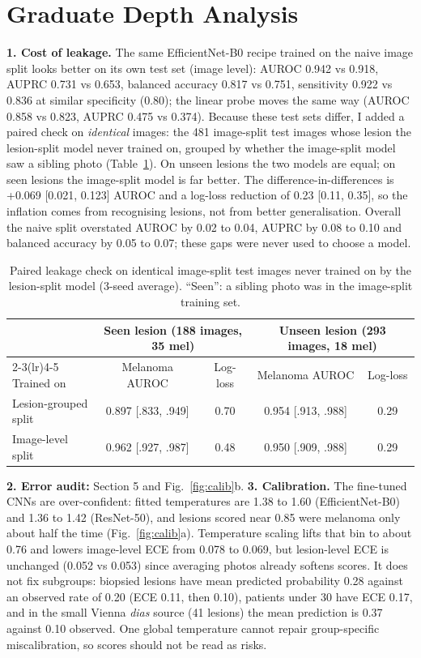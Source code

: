 \documentclass{article}
\newcommand{\ci}[2]{{\scriptsize[#1, #2]}}
\begin{document}
\section{Graduate Depth Analysis}
\textbf{1. Cost of leakage.} The same EfficientNet-B0 recipe trained on the naive image split looks
better on its own test set (image level): AUROC 0.942 vs 0.918, AUPRC 0.731 vs 0.653, balanced
accuracy 0.817 vs 0.751, sensitivity 0.922 vs 0.836 at similar specificity (0.80); the linear probe
moves the same way (AUROC 0.858 vs 0.823, AUPRC 0.475 vs 0.374). Because these test sets differ, I added
a paired check on \emph{identical} images: the 481 image-split test images whose lesion the
lesion-split model never trained on, grouped by whether the image-split model saw a sibling photo
(Table~\ref{tab:leak}). On unseen lesions the two models are equal; on seen lesions the image-split
model is far better. The difference-in-differences is +0.069 \ci{0.021}{0.123} AUROC and a log-loss
reduction of 0.23 \ci{0.11}{0.35}, so the inflation comes from recognising lesions, not from better
generalisation. Overall the naive split overstated AUROC by 0.02 to 0.04, AUPRC by 0.08 to 0.10 and
balanced accuracy by 0.05 to 0.07; these gaps were never used to choose a model.

\begin{table}[t]
\caption{Paired leakage check on identical image-split test images never trained on by the
lesion-split model (3-seed average). ``Seen'': a sibling photo was in the image-split training set.}
\label{tab:leak}
\centering
\footnotesize
\begin{tabular}{lcccc}
\toprule
& \multicolumn{2}{c}{Seen lesion (188 images, 35 mel)} & \multicolumn{2}{c}{Unseen lesion (293 images, 18 mel)} \\
\cmidrule(lr){2-3}\cmidrule(lr){4-5}
Trained on & Melanoma AUROC & Log-loss & Melanoma AUROC & Log-loss \\
\midrule
Lesion-grouped split & 0.897 \ci{.833}{.949} & 0.70 & 0.954 \ci{.913}{.988} & 0.29 \\
Image-level split & 0.962 \ci{.927}{.987} & 0.48 & 0.950 \ci{.909}{.988} & 0.29 \\
\bottomrule
\end{tabular}
\end{table}

\textbf{2. Error audit:} Section 5 and Fig.~\ref{fig:calib}b. \textbf{3. Calibration.} The fine-tuned CNNs are over-confident: fitted temperatures are 1.38 to 1.60
(EfficientNet-B0) and 1.36 to 1.42 (ResNet-50), and lesions scored near 0.85 were melanoma only about
half the time (Fig.~\ref{fig:calib}a). Temperature scaling lifts that bin to about 0.76 and lowers
image-level ECE from 0.078 to 0.069, but lesion-level ECE is unchanged (0.052 vs 0.053) since
averaging photos already softens scores. It does not fix subgroups: biopsied lesions
have mean predicted probability 0.28 against an observed rate of 0.20 (ECE 0.11, then 0.10), patients
under 30 have ECE 0.17, and in the small Vienna \textit{dias} source (41 lesions) the mean prediction
is 0.37 against 0.10 observed. One global temperature cannot repair group-specific miscalibration, so
scores should not be read as risks.
\end{document}
